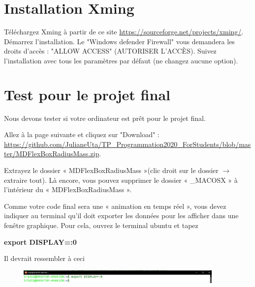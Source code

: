 \documentclass{article}
\begin{document}
\section{Installation Xming}
Téléchargez Xming à partir de ce site \href{https://sourceforge.net/projects/xming/}{https://sourceforge.net/projects/xming/}. Démarrez l'installation. Le "Windows defender Firewall" vous demandera les droits d'accès : "ALLOW ACCESS" (AUTORISER L'ACCÈS). Suivez l'installation avec tous les paramètres par défaut (ne changez aucune option).

\section{Test pour le projet final}
Nous devons tester si votre ordinateur est prêt pour le projet final.

Allez à la page suivante et cliquez sur "Download" : \\ \href{https://github.com/JulianeUta/TP_Programmation2020_ForStudents/blob/master/MDFlexBoxRadiusMass.zip}{https://github.com/JulianeUta/TP\_Programmation2020\_ForStudents/blob/master/MDFlexBoxRadiusMass.zip}.

Extrayez le dossier « MDFlexBoxRadiusMass »(clic droit sur le dossier $\rightarrow$ extraire tout). Là encore, vous pouvez supprimer le dossier « \_MACOSX » à l'intérieur du « MDFlexBoxRadiusMass ».

Comme votre code final sera une « animation en temps réel », vous devez indiquer au terminal qu'il doit exporter les données pour les afficher dans une fenêtre graphique. Pour cela, ouvrez le terminal ubuntu et tapez 
\begin{tcolorbox}[width=\textwidth,colframe=BurntOrange,colback={black},title={ubuntu terminal},outer arc=0mm,colupper=white]  
    \large\textbf{  export DISPLAY=:0 }
\end{tcolorbox}
Il devrait ressembler à ceci
\begin{figure}[H]
\center
\includegraphics[width=0.9\textwidth]{Plots/MD_1EXPORT.jpeg}
\end{figure}
\end{document}

